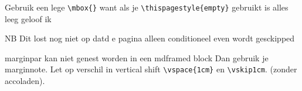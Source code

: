 \documentclass[../../main.tex]{subfiles}
\begin{document}
\newpage
\mbox{}


Gebruik een lege \verb+\mbox{}+ want als je \verb+\thispagestyle{empty}+ gebruikt is alles leeg geloof ik

NB Dit lost nog niet op datd e pagina alleen conditioneel even wordt gesckipped

\clearpage

marginpar kan niet genest worden in een mdframed block Dan gebruik je marginnote. 
Let op verschil in vertical shift \verb+\vspace{1cm}+ en \verb+\vskip1cm+. (zonder accoladen).
\end{document}
